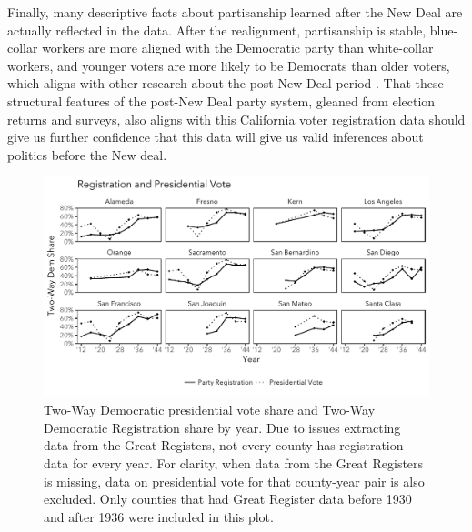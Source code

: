 \documentclass[11pt]{scrartcl}\usepackage[]{graphicx}\usepackage[]{color}
\makeatletter
\def\maxwidth{ %
  \ifdim\Gin@nat@width>\linewidth
    \linewidth
  \else
    \Gin@nat@width
  \fi
}
\newenvironment{knitrout}{}{} %
\makeatother
\begin{document}
Finally, many descriptive facts about partisanship learned after the New Deal are actually reflected in the data. After the realignment, partisanship is stable, blue-collar workers are more aligned with the Democratic party than white-collar workers, and younger voters are more likely to be Democrats than older voters, which aligns with other research about the post New-Deal period \citep{campbell1960american,alford1963role}. That these structural features of the post-New Deal party system, gleaned from election returns and surveys, also aligns with this California voter registration data should give us further confidence that this data will give us valid inferences about politics before the New deal.


\begin{knitrout}
\color{fgcolor}\begin{figure}

{\centering \includegraphics[width=\maxwidth]{figures/plots-countyparty-1} 

}

\caption[Two-Way Democratic presidential vote share and Two-Way Democratic Registration share by year]{Two-Way Democratic presidential vote share and Two-Way Democratic Registration share by year. Due to issues extracting data from the Great Registers, not every county has registration data for every year. For clarity, when data from the Great Registers is missing, data on presidential vote for that county-year pair is also excluded. Only counties that had Great Register data before 1930 and after 1936 were included in this plot.}\label{fig:countyparty}
\end{figure}


\end{knitrout}
\end{document}
